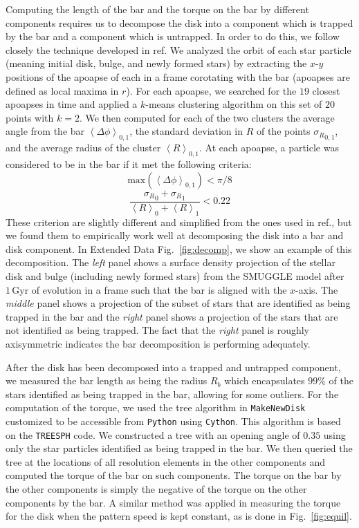 \documentclass[twoside]{natureprintstyle}
\begin{document}
Computing the length of the bar and the torque on the bar by different
components requires us to decompose the disk into a component which is trapped
by the bar and a component which is untrapped. In order to do this, we follow
closely the technique developed in ref.\cite{2016MNRAS.463.1952P} We analyzed
the orbit of each star particle (meaning initial disk, bulge, and newly formed
stars) by extracting the $x$-$y$ positions of the apoapse of each in a frame
corotating with the bar (apoapses are defined as local maxima in $r$). For
each apoapse, we searched for the $19$ closest apoapses in time and applied a
$k$-means clustering algorithm on this set of $20$ points with $k=2$. We then
computed for each of the two clusters the average angle from the bar
$\left<\Delta \phi\right>_{0,1}$, the standard deviation in $R$ of the points
${\sigma_R}_{0,1}$, and the average radius of the cluster
$\left<R\right>_{0,1}$. At each apoapse, a particle was considered to be in
the bar if it met the following criteria:
\begin{equation}
\textrm{max}\left(\left<\Delta \phi\right>_{0,1}\right) < \pi / 8
\end{equation}
\begin{equation}
\frac{{\sigma_R}_0 + {\sigma_R}_1}{\left<R\right>_0 + \left<R\right>_1} < 0.22
\end{equation}
These criterion are slightly different and simplified from the ones used in
ref.\cite{2016MNRAS.463.1952P}, but we found them to empirically work well at
decomposing the disk into a bar and disk component. In Extended Data
Fig.~\ref{fig:decomp}, we show an example of this decomposition. The
\textit{left} panel shows a surface density projection of the stellar disk and
bulge (including newly formed stars) from the SMUGGLE model after
$1\,\text{Gyr}$ of evolution in a frame such that the bar is aligned with the
$x$-axis. The \textit{middle} panel shows a projection of the subset of stars
that are identified as being trapped in the bar and the \textit{right} panel
shows a projection of the stars that are not identified as being trapped. The
fact that the \textit{right} panel is roughly axisymmetric indicates the bar
decomposition is performing adequately.

After the disk has been decomposed into a trapped and untrapped component, we
measured the bar length as being the radius $R_b$ which encapsulates $99\%$ of
the stars identified as being trapped in the bar, allowing for some outliers.
For the computation of the torque, we used the tree algorithm in
\texttt{MakeNewDisk}\cite{2005MNRAS.361..776S} customized to be accessible
from \texttt{Python} using \texttt{Cython}. This algorithm is based on the
\texttt{TREESPH} code.\cite{1989ApJS...70..419H} We constructed a tree with an opening angle of $0.35$ using
only the star particles identified as being trapped in the bar. We then queried the tree at the locations of all
resolution elements in the other components and computed the torque of the bar
on such components. The torque on the bar by the other components is simply
the negative of the torque on the other components by the bar. A similar
method was applied in measuring the torque for the disk when the pattern speed
is kept constant, as is done in Fig.~\ref{fig:equil}.
\end{document}
